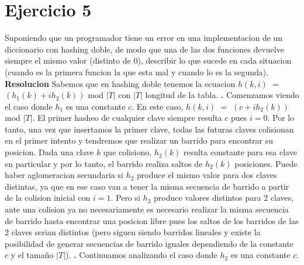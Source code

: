 \documentclass[10pt,a4paper]{article}
\begin{document}
\section{Ejercicio 5}

Suponiendo que un programador tiene un error en una implementacion de un diccionario con hashing doble, de modo que una de las dos funciones devuelve siempre el mismo valor (distinto de 0), describir lo que sucede en cada situacion (cuando es la primera funcion la que esta mal y cuando lo es la segunda).
\newline
\newline
\textbf{Resolucion}
\newline
\newline
Sabemos que en hashing doble tenemos la ecuacion $h(k,i)$ $=$ $(h_{1}(k) + ih_{2}(k))$ mod $|T|$ con $|T|$ longitud de la tabla.  
\newline 
\newline
\textbf{.} Comenzamos viendo el caso donde $h_{1}$ es una constante $c$.
\newline 
\newline
En este caso, $h(k,i)$ $=$ $(c + ih_{2}(k))$ mod $|T|$.
\newline 
\newline
El primer hasheo de cualquier clave siempre resulta $c$ pues $i = 0$. Por lo tanto, una vez que insertamos la primer clave, todas las futuras claves colisionan en el primer intento y tendremos que realizar un barrido para encontrar su posicion. Dada una clave $k$ que colisiono, $h_{2}(k)$ resulta constante para esa clave en particular y por lo tanto, el barrido realiza saltos de $h_{2}(k)$ posiciones.
\newline 
\newline
Puede haber aglomeracion secundaria si $h_{2}$ produce el mismo valor para dos claves distintas, ya que en ese caso van a tener la misma secuencia de barrido a partir de la colision inicial con $i = 1$. Pero si $h_{2}$ produce valores distintos para 2 claves, ante una colision ya no necesariamente es necesario realizar la misma secuencia de barrido hasta encontrar una posicion libre pues los saltos de los barridos de las 2 claves serian distintos (pero siguen siendo barridos lineales y existe la posibilidad de generar secuencias de barrido iguales dependiendo de la constante $c$ y el tamaño $|T|$).  
\newline 
\newline
\textbf{.} Continuamos analizando el caso donde $h_{2}$ es una constante $c$.
\newline 
\end{document}
